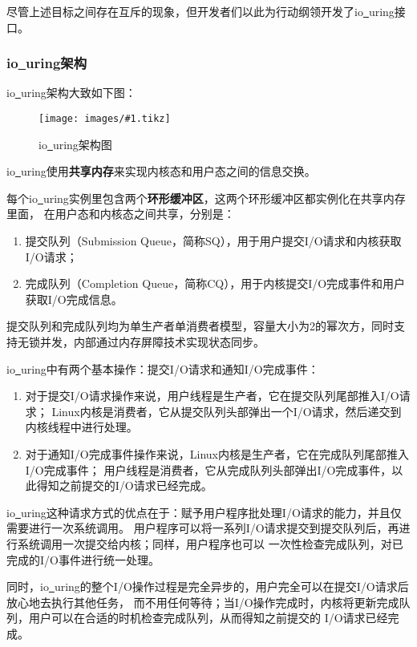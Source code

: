 \documentclass[supercite]{HustGraduPaper}
\newcommand{\cfig}[3]{
  \begin{figure}[htb]
    \centering
    \texttt{[image: images/\#1.tikz]}
    \caption{#3}
    \label{fig:#1}
  \end{figure}
}
\theoremstyle{definition}
\begin{document}
尽管上述目标之间存在互斥的现象，但开发者们以此为行动纲领开发了io\underline{~}uring接口。\par

\subsubsection{io\underline{~}uring架构}
io\underline{~}uring架构大致如下图：\par

\cfig{io-uring}{0.8}{io\underline{~}uring架构图}

io\underline{~}uring使用\textbf{共享内存}来实现内核态和用户态之间的信息交换。\par

每个io\underline{~}uring实例里包含两个\textbf{环形缓冲区}，这两个环形缓冲区都实例化在共享内存里面，
在用户态和内核态之间共享，分别是：

\begin{enumerate}
  \item 提交队列（Submission Queue，简称SQ），用于用户提交I/O请求和内核获取I/O请求；
  \item 完成队列（Completion Queue，简称CQ），用于内核提交I/O完成事件和用户获取I/O完成信息。
\end{enumerate}

提交队列和完成队列均为单生产者单消费者模型，容量大小为2的幂次方，同时支持无锁并发，内部通过内存屏障技术实现状态同步。\par

io\underline{~}uring中有两个基本操作：提交I/O请求和通知I/O完成事件：
\begin{enumerate}
  \item 对于提交I/O请求操作来说，用户线程是生产者，它在提交队列尾部推入I/O请求；
    Linux内核是消费者，它从提交队列头部弹出一个I/O请求，然后递交到内核线程中进行处理。
  \item 对于通知I/O完成事件操作来说，Linux内核是生产者，它在完成队列尾部推入I/O完成事件；
    用户线程是消费者，它从完成队列头部弹出I/O完成事件，以此得知之前提交的I/O请求已经完成。
\end{enumerate}

io\underline{~}uring这种请求方式的优点在于：赋予用户程序批处理I/O请求的能力，并且仅需要进行一次系统调用。
用户程序可以将一系列I/O请求提交到提交队列后，再进行系统调用一次提交给内核；同样，用户程序也可以
一次性检查完成队列，对已完成的I/O事件进行统一处理。\par

同时，io\underline{~}uring的整个I/O操作过程是完全异步的，用户完全可以在提交I/O请求后放心地去执行其他任务，
而不用任何等待；当I/O操作完成时，内核将更新完成队列，用户可以在合适的时机检查完成队列，从而得知之前提交的
I/O请求已经完成。\par
\end{document}
